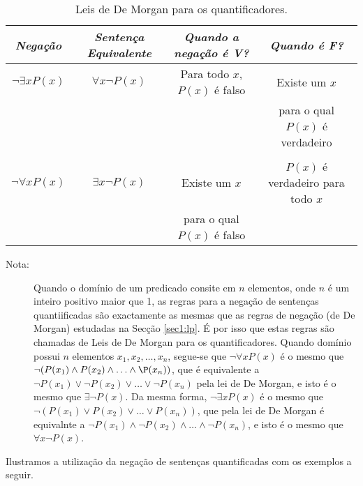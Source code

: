 \begin{table}[H]
	\centering
	\scriptsize{
	\begin{tabular}{|c||c||c||c|}%
	\toprule
	\textbf{\emph{Negação}}&\textbf{\emph{Sentença
	Equivalente}}&\textbf{\emph{Quando a negação é V?}}&\textbf{\emph{Quando
	é F?}}\\
	\midrule
	$\lnot \exists xP(x)$ & $\forall x\lnot P(x)$ & Para todo $x$, $P(x)$ é falso &
	Existe um $x$ \\ & & & para o qual $P(x)$ é verdadeiro\\
	&&& \\
	
	$\lnot \forall xP(x)$ & $\exists x\lnot P(x)$ & Existe um $x$ & $P(x)$ é verdadeiro para todo $x$\\
	& & para o qual $P(x)$ é falso &\\
	\bottomrule%
	\end{tabular}%
	}
	\caption{Leis de De Morgan para os quantificadores.}
	\label{tab128}
\end{table}

\begin{description}
\item[Nota:] Quando o domínio de um predicado consite em $n$ elementos, onde $n$
é um inteiro positivo maior que 1, as regras para a negação de sentenças
quantiificadas são exactamente as mesmas que as regras de negação (de De Morgan)
estudadas na Secção \ref{sec1:lp}. É por isso que estas regras são chamadas de
Leis de De Morgan para os quantificadores. Quando domínio possui $n$ elementos
$x_1, x_2, \ldots, x_n$, segue-se que $\lnot\forall xP(x)$ é o mesmo que
$\lnot(P(x_1) \land P(x_2) \land \ldots \land \P(x_n))$, que é equivalente a
$\lnot P(x_1) \lor \lnot P(x_2) \lor \ldots \lor \lnot P(x_n)$ pela lei de De
Morgan, e isto é o mesmo que $\exists\lnot P(x)$. Da mesma forma, $\lnot\exists
xP(x)$ é o mesmo que $\lnot(P(x_1) \lor P(x_2) \lor \ldots \lor P(x_n))$, que
pela lei de De Morgan é equivalnte a $\lnot P(x_1) \land \lnot P(x_2) \land
\ldots \land \lnot P(x_n) $, e isto é o mesmo que $\forall x\lnot P(x)$.
\end{description}

Ilustramos a utilização da negação de sentenças quantificadas com os exemplos a
seguir.


